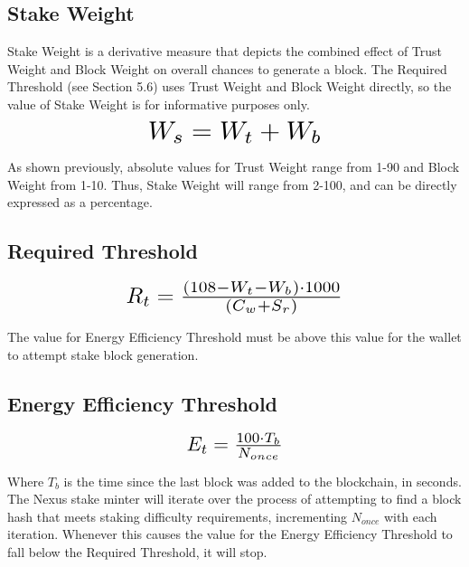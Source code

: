 \documentclass[11pt]{article}
\begin{document}
\subsection{Stake Weight}
Stake Weight is a derivative measure that depicts the combined effect of Trust Weight and Block Weight on overall chances to generate a block. The Required Threshold (see Section 5.6) uses Trust Weight and Block Weight directly, so the value of Stake Weight is for informative purposes only.\\

\begin{equation}
\resizebox{.40\hsize}{!}{$W_{s} = W_{t} + W_{b}$}
\end{equation}

\noindent As shown previously, absolute values for Trust Weight range from 1-90 and Block Weight from 1-10. Thus, Stake Weight will range from 2-100, and can be directly expressed as a percentage.\\


\subsection{Required Threshold}

\begin{equation}
\resizebox{.5\hsize}{!}{$R_{t} = \frac{(108 - W_{t} - W_{b}) \cdot 1000}{(C_{w} + S_{r})}$}
\end{equation}


\noindent The value for Energy Efficiency Threshold must be above this value for the wallet to attempt stake block generation.\\


\subsection{Energy Efficiency Threshold}

\begin{equation}
\resizebox{.22\hsize}{!}{$E_{t} = \frac{100 \cdot T_{b}}{N_{once}}$}
\end{equation}

\noindent Where $T_{b}$ is the time since the last block was added to the blockchain, in seconds.\\

\noindent The Nexus stake minter will iterate over the process of attempting to find a block hash that meets staking difficulty requirements, incrementing $N_{once}$ with each iteration. Whenever this causes the value for the Energy Efficiency Threshold to fall below the Required Threshold, it will stop.\\
\end{document}
